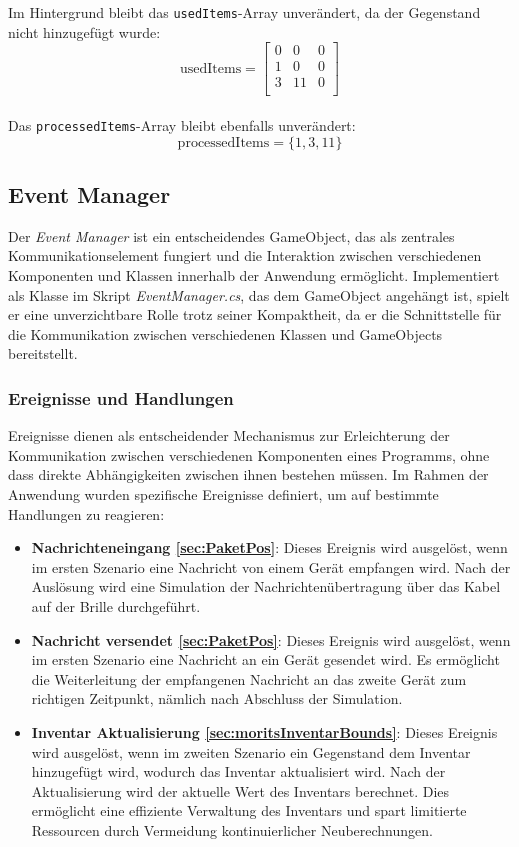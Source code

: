 Im Hintergrund bleibt das \texttt{usedItems}-Array unverändert, da der Gegenstand nicht hinzugefügt wurde:
\[
\text{usedItems} =
\left[
\begin{array}{ccccc}
0 & 0 & 0 \\
1 & 0 & 0 \\
3 & 11 & 0 \\
\end{array}
\right]
\]
\\
Das \texttt{processedItems}-Array bleibt ebenfalls unverändert:
\[
\text{processedItems} = \{1, 3, 11\}
\]




\subsection{\label{sec:eventmanager}Event Manager}

Der \textit{Event Manager} ist ein entscheidendes GameObject, das als zentrales Kommunikationselement fungiert und die
Interaktion zwischen verschiedenen Komponenten und Klassen innerhalb der Anwendung ermöglicht. Implementiert als Klasse
im Skript \textit{EventManager.cs}, das dem GameObject angehängt ist, spielt er eine unverzichtbare Rolle trotz seiner
Kompaktheit, da er die Schnittstelle für die Kommunikation zwischen verschiedenen Klassen und GameObjects bereitstellt.


\subsubsection*{Ereignisse und Handlungen}

Ereignisse dienen als entscheidender Mechanismus zur Erleichterung der Kommunikation zwischen verschiedenen Komponenten eines Programms, ohne dass direkte Abhängigkeiten zwischen ihnen bestehen müssen. Im Rahmen der Anwendung wurden spezifische Ereignisse definiert, um auf bestimmte Handlungen zu reagieren:

\begin{itemize}
\item \textbf{Nachrichteneingang \ref{sec:PaketPos}}: Dieses Ereignis wird ausgelöst, wenn im ersten Szenario eine Nachricht von einem Gerät empfangen wird. Nach der Auslösung wird eine Simulation der Nachrichtenübertragung über das Kabel auf der Brille durchgeführt.
\item \textbf{Nachricht versendet \ref{sec:PaketPos}}: Dieses Ereignis wird ausgelöst, wenn im ersten Szenario eine Nachricht an ein Gerät gesendet wird. Es ermöglicht die Weiterleitung der empfangenen Nachricht an das zweite Gerät zum richtigen Zeitpunkt, nämlich nach Abschluss der Simulation.
\item \textbf{Inventar Aktualisierung \ref{sec:moritsInventarBounds}}: Dieses Ereignis wird ausgelöst, wenn im zweiten Szenario ein Gegenstand dem Inventar hinzugefügt wird, wodurch das Inventar aktualisiert wird. Nach der Aktualisierung wird der aktuelle Wert des Inventars berechnet. Dies ermöglicht eine effiziente Verwaltung des Inventars und spart limitierte Ressourcen durch Vermeidung kontinuierlicher Neuberechnungen.
\end{itemize}

